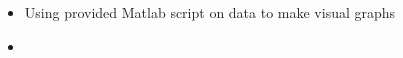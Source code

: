 
\begin{itemize}
  \item Using provided Matlab script on data to make visual graphs
  \item
\end{itemize}
